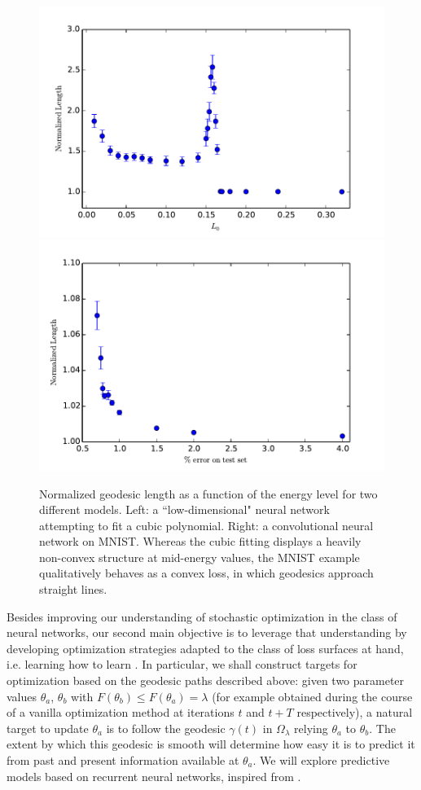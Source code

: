 \documentclass[10pt]{article}
\begin{document}
\begin{figure}
\label{figurelength}
\centering
\includegraphics[width=.4\textwidth]{../Writeup/Plots/normlengthcubics}
\includegraphics[width=.4\textwidth]{../Writeup/Plots/normlengthMNIST}
\caption{Normalized geodesic length as a function of the energy level for two different models. Left: a ``low-dimensional" neural network 
attempting to fit a cubic polynomial. Right: a convolutional neural network on MNIST. Whereas the cubic fitting displays a heavily non-convex structure 
at mid-energy values, the MNIST example qualitatively behaves as a convex loss, in which geodesics approach straight lines.}
\end{figure}

Besides improving our understanding of stochastic optimization in the class of neural networks, our second main objective is to leverage that understanding 
by developing optimization strategies adapted to the class of loss surfaces at hand, i.e. learning how to learn \cite{andrychowicz2016learning}. 
In particular, we shall construct targets for optimization based on the geodesic paths described above: given two parameter values 
$\theta_a$, $\theta_b$ with $F(\theta_b) \leq F(\theta_a)=\lambda$ (for example obtained during the course of a vanilla optimization method at iterations $t$ and $t+T$ respectively), a natural target to update $\theta_a$ is to follow the geodesic $\gamma(t)$ in $\Omega_\lambda$ relying $\theta_a$ to $\theta_b$. 
The extent by which this geodesic is smooth will determine how easy it is to predict it from past and present information available at $\theta_a$. We will explore predictive models based on recurrent neural networks, inspired from \cite{andrychowicz2016learning}.
\end{document}
